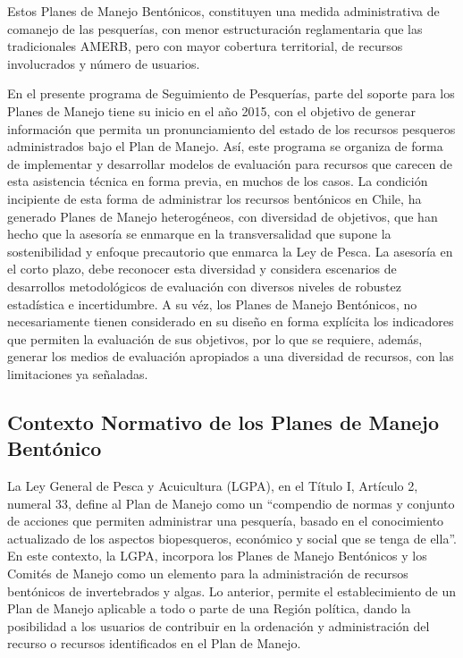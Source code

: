 \documentclass[
]{article}
\begin{document}
Estos Planes de Manejo Bentónicos, constituyen una medida administrativa
de comanejo de las pesquerías, con menor estructuración reglamentaria
que las tradicionales AMERB, pero con mayor cobertura territorial, de
recursos involucrados y número de usuarios.

En el presente programa de Seguimiento de Pesquerías, parte del soporte
para los Planes de Manejo tiene su inicio en el año 2015, con el
objetivo de generar información que permita un pronunciamiento del
estado de los recursos pesqueros administrados bajo el Plan de Manejo.
Así, este programa se organiza de forma de implementar y desarrollar
modelos de evaluación para recursos que carecen de esta asistencia
técnica en forma previa, en muchos de los casos. La condición incipiente
de esta forma de administrar los recursos bentónicos en Chile, ha
generado Planes de Manejo heterogéneos, con diversidad de objetivos, que
han hecho que la asesoría se enmarque en la transversalidad que supone
la sostenibilidad y enfoque precautorio que enmarca la Ley de Pesca. La
asesoría en el corto plazo, debe reconocer esta diversidad y considera
escenarios de desarrollos metodológicos de evaluación con diversos
niveles de robustez estadística e incertidumbre. A su véz, los Planes de
Manejo Bentónicos, no necesariamente tienen considerado en su diseño en
forma explícita los indicadores que permiten la evaluación de sus
objetivos, por lo que se requiere, además, generar los medios de
evaluación apropiados a una diversidad de recursos, con las limitaciones
ya señaladas.  

\hypertarget{contexto-normativo-de-los-planes-de-manejo-bentuxf3nico}{%
\subsection{Contexto Normativo de los Planes de Manejo
Bentónico}\label{contexto-normativo-de-los-planes-de-manejo-bentuxf3nico}}

La Ley General de Pesca y Acuicultura (LGPA), en el Título I, Artículo
2, numeral 33, define al Plan de Manejo como un ``compendio de normas y
conjunto de acciones que permiten administrar una pesquería, basado en
el conocimiento actualizado de los aspectos biopesqueros, económico y
social que se tenga de ella''. En este contexto, la LGPA, incorpora los
Planes de Manejo Bentónicos y los Comités de Manejo como un elemento
para la administración de recursos bentónicos de invertebrados y algas.
Lo anterior, permite el establecimiento de un Plan de Manejo aplicable a
todo o parte de una Región política, dando la posibilidad a los usuarios
de contribuir en la ordenación y administración del recurso o recursos
identificados en el Plan de Manejo.
\end{document}
